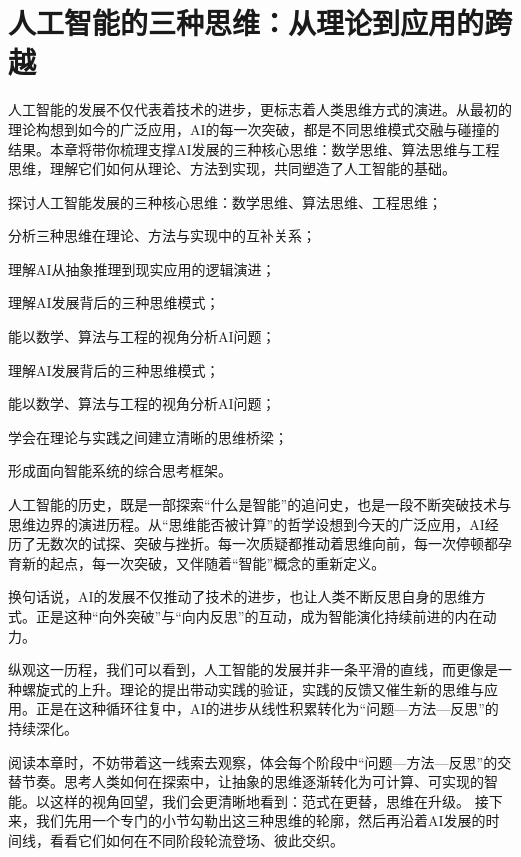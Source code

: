 \chapter{人工智能的三种思维：从理论到应用的跨越}

人工智能的发展不仅代表着技术的进步，更标志着人类思维方式的演进。从最初的理论构想到如今的广泛应用，AI的每一次突破，都是不同思维模式交融与碰撞的结果。本章将带你梳理支撑AI发展的三种核心思维：数学思维、算法思维与工程思维，理解它们如何从理论、方法到实现，共同塑造了人工智能的基础。

\begin{introduction}
  \item 探讨人工智能发展的三种核心思维：数学思维、算法思维、工程思维；
  \item 分析三种思维在理论、方法与实现中的互补关系；
  \item 理解AI从抽象推理到现实应用的逻辑演进；
  \item  理解AI发展背后的三种思维模式；
  \item 能以数学、算法与工程的视角分析AI问题；
\end{introduction}

\begin{introduction}
  \item 理解AI发展背后的三种思维模式；
  \item 能以数学、算法与工程的视角分析AI问题；
  \item 学会在理论与实践之间建立清晰的思维桥梁；
  \item 形成面向智能系统的综合思考框架。
\end{introduction}

人工智能的历史，既是一部探索“什么是智能”的追问史，也是一段不断突破技术与思维边界的演进历程。从“思维能否被计算”的哲学设想到今天的广泛应用，AI经历了无数次的试探、突破与挫折。每一次质疑都推动着思维向前，每一次停顿都孕育新的起点，每一次突破，又伴随着“智能”概念的重新定义。

换句话说，AI的发展不仅推动了技术的进步，也让人类不断反思自身的思维方式。正是这种“向外突破”与“向内反思”的互动，成为智能演化持续前进的内在动力。

纵观这一历程，我们可以看到，人工智能的发展并非一条平滑的直线，而更像是一种螺旋式的上升。理论的提出带动实践的验证，实践的反馈又催生新的思维与应用。正是在这种循环往复中，AI的进步从线性积累转化为“问题—方法—反思”的持续深化。

阅读本章时，不妨带着这一线索去观察，体会每个阶段中“问题—方法—反思”的交替节奏。思考人类如何在探索中，让抽象的思维逐渐转化为可计算、可实现的智能。以这样的视角回望，我们会更清晰地看到：范式在更替，思维在升级。
接下来，我们先用一个专门的小节勾勒出这三种思维的轮廓，然后再沿着AI发展的时间线，看看它们如何在不同阶段轮流登场、彼此交织。

